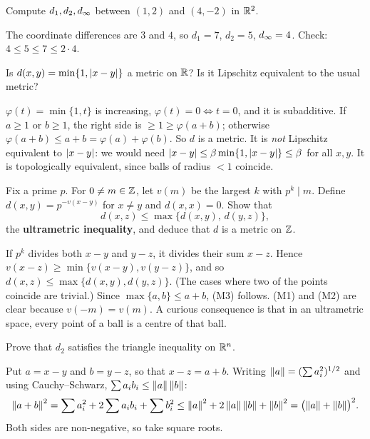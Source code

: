 \begin{exercise}\easy
Compute $d_1,d_2,d_\infty$ between $(1,2)$ and $(4,-2)$ in $\mathbb{R}^2$.
\end{exercise}
\begin{solution}
The coordinate differences are $3$ and $4$, so $d_1=7$, $d_2=5$, $d_\infty=4$. Check: $4\le5\le7\le2\cdot4$.
\end{solution}

\begin{exercise}\medium
Is $d(x,y)=\min\{1,\left\lvert x-y\right\rvert\}$ a metric on $\mathbb{R}$? Is it Lipschitz equivalent to the usual metric?
\end{exercise}
\begin{solution}
$\varphi(t)=\min\{1,t\}$ is increasing, $\varphi(t)=0\iff t=0$, and it is subadditive. If $a\ge1$ or $b\ge1$, the right side is $\ge1\ge\varphi(a+b)$; otherwise $\varphi(a+b)\le a+b=\varphi(a)+\varphi(b)$. So $d$ is a metric. It is \emph{not} Lipschitz equivalent to $\left\lvert x-y\right\rvert$: we would need $\left\lvert x-y\right\rvert\le\beta\min\{1,\left\lvert x-y\right\rvert\}\le\beta$ for all $x,y$. It is topologically equivalent, since balls of radius $<1$ coincide.
\end{solution}

\begin{exercise}\hard
Fix a prime $p$. For $0\ne m\in\mathbb{Z}$, let $v(m)$ be the largest $k$ with $p^k\mid m$. Define $d(x,y)=p^{-v(x-y)}$ for $x\ne y$ and $d(x,x)=0$. Show that
\[
  d(x,z)\le\max\{d(x,y),\,d(y,z)\},
\]
the \textbf{ultrametric inequality}, and deduce that $d$ is a metric on $\mathbb{Z}$.
\end{exercise}
\begin{solution}
If $p^k$ divides both $x-y$ and $y-z$, it divides their sum $x-z$. Hence $v(x-z)\ge\min\{v(x-y),v(y-z)\}$, and so $d(x,z)\le\max\{d(x,y),d(y,z)\}$. (The cases where two of the points coincide are trivial.) Since $\max\{a,b\}\le a+b$, \textup{(M3)} follows. \textup{(M1)} and \textup{(M2)} are clear because $v(-m)=v(m)$. A curious consequence is that in an ultrametric space, every point of a ball is a centre of that ball.
\end{solution}

\begin{exercise}\hard\label{exr:d2}
Prove that $d_2$ satisfies the triangle inequality on $\mathbb{R}^n$.
\end{exercise}
\begin{solution}
Put $a=x-y$ and $b=y-z$, so that $x-z=a+b$. Writing $\left\lVert a\right\rVert=(\sum a_i^2)^{1/2}$ and using Cauchy--Schwarz, $\sum a_ib_i\le\left\lVert a\right\rVert\left\lVert b\right\rVert$:
\[
  \left\lVert a+b\right\rVert^2=\sum a_i^2+2\sum a_ib_i+\sum b_i^2\le\left\lVert a\right\rVert^2+2\left\lVert a\right\rVert\left\lVert b\right\rVert+\left\lVert b\right\rVert^2=\bigl(\left\lVert a\right\rVert+\left\lVert b\right\rVert\bigr)^2 .
\]
Both sides are non-negative, so take square roots.
\end{solution}
